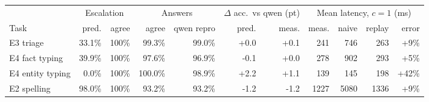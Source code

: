 \begin{tabular}{lrrrrrrrrrr}
\toprule
 & \multicolumn{2}{c}{Escalation} & \multicolumn{2}{c}{Answers} & \multicolumn{2}{c}{$\Delta$ acc.\ vs qwen (pt)} & \multicolumn{4}{c}{Mean latency, $c=1$ (ms)} \\
\cmidrule(lr){2-3}\cmidrule(lr){4-5}\cmidrule(lr){6-7}\cmidrule(lr){8-11}
Task & pred. & agree & agree & qwen repro & pred. & meas. & meas. & naive & replay & error \\
\midrule
E3 triage & 33.1\% & 100\% & 99.3\% & 99.0\% & +0.0 & +0.1 & 241 & 746 & 263 & +9\% \\
E4 fact typing & 39.9\% & 100\% & 97.6\% & 96.9\% & -0.1 & +0.0 & 278 & 902 & 293 & +5\% \\
E4 entity typing & 0.0\% & 100\% & 100.0\% & 98.9\% & +2.2 & +1.1 & 139 & 145 & 198 & +42\% \\
E2 spelling & 98.0\% & 100\% & 93.2\% & 93.2\% & -1.2 & -1.2 & 1227 & 5080 & 1336 & +9\% \\
\bottomrule
\end{tabular}
